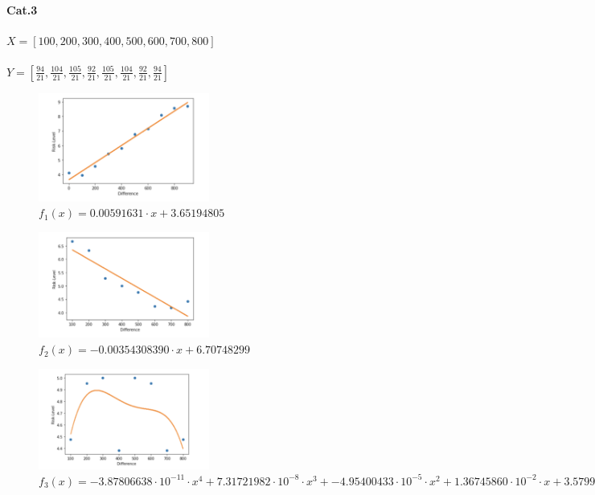 \paragraph{Cat.3}\par
$X=[100,200,300,400,500,600,700,800]$\\ \\
$Y=[\frac{94}{21},\frac{104}{21},\frac{105}{21},\frac{92}{21},\frac{105}{21},\frac{104}{21},\frac{92}{21},\frac{94}{21}]$
\begin{figure}[h]
    \centering
    \includegraphics[width=0.5\textwidth]{Bilder/risk_level_diffrence_200steps}
    \caption{$f_1(x)=0.00591631\cdot x+3.65194805$}
    \label{fig:meine-grafik}
\end{figure}
\begin{figure}[h]
    \centering
    \includegraphics[width=0.5\textwidth]{Bilder/risk_level_diffrence_100steps}
    \caption{$f_2(x)=-0.00354308390\cdot x+6.70748299$}
    \label{fig:meine-grafik}
\end{figure}
\begin{figure}[h]
    \centering
    \includegraphics[width=0.5\textwidth]{Bilder/risk_level_diffrence_nonlinear}
    \caption{$f_3(x)=-3.87806638\cdot 10^{-11}\cdot x^4+7.31721982\cdot 10^{-8}\cdot x^3+ -4.95400433\cdot 10^{-5} \cdot x^2+ 1.36745860 \cdot 10^{-2} \cdot x+3.57993197$}
    \label{fig:meine-grafik}
\end{figure}
